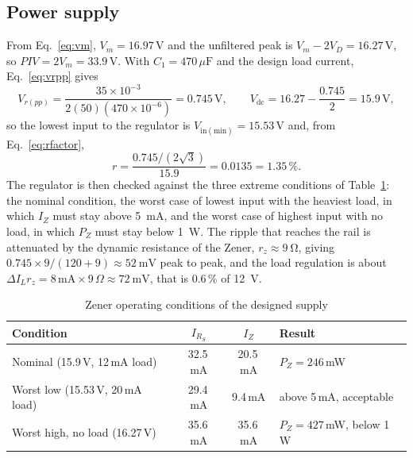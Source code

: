 \documentclass[12pt,a4paper]{article}
\begin{document}
	\subsection{Power supply}
	From Eq.~\eqref{eq:vm}, $V_m=16.97\,\mathrm{V}$ and the unfiltered peak is $V_m-2V_D=16.27\,\mathrm{V}$, so $PIV=2V_m=33.9\,\mathrm{V}$. With $C_1=470\,\mu\mathrm{F}$ and the design load current, Eq.~\eqref{eq:vrpp} gives
	\begin{equation}
		V_{r(pp)}=\frac{35\times10^{-3}}{2(50)(470\times10^{-6})}=0.745\,\mathrm{V},
		\qquad
		V_{\mathrm{dc}}=16.27-\frac{0.745}{2}=15.9\,\mathrm{V},
		\label{eq:calc-supply}
	\end{equation}
	so the lowest input to the regulator is $V_{\mathrm{in(min)}}=15.53\,\mathrm{V}$ and, from Eq.~\eqref{eq:rfactor},
	\begin{equation}
		r=\frac{0.745/(2\sqrt{3})}{15.9}=0.0135=1.35\,\%.
		\label{eq:calc-r}
	\end{equation}
	The regulator is then checked against the three extreme conditions of Table~\ref{tab:zener}: the nominal condition, the worst case of lowest input with the heaviest load, in which $I_Z$ must stay above \SI{5}{\milli\ampere}, and the worst case of highest input with no load, in which $P_Z$ must stay below \SI{1}{\watt}. The ripple that reaches the rail is attenuated by the dynamic resistance of the Zener, $r_z\approx\SI{9}{\ohm}$, giving $0.745\times9/(120+9)\approx\SI{52}{\milli\volt}$ peak to peak, and the load regulation is about $\Delta I_Lr_z=8\,\mathrm{mA}\times9\,\Omega\approx\SI{72}{\milli\volt}$, that is 0.6\,\% of \SI{12}{\volt}.

	\begin{table}[H]
		\centering
		\caption{Zener operating conditions of the designed supply}
		\label{tab:zener}
		\renewcommand{\arraystretch}{1.25}
		\begin{tabular}{|l|c|c|l|}
			\hline
			\rowcolor{black!12}\textbf{Condition} & \textbf{$I_{R_S}$} & \textbf{$I_Z$} & \textbf{Result} \\
			\hline
			Nominal (15.9\,V, 12\,mA load) & 32.5\,mA & 20.5\,mA & $P_Z=246$\,mW \\
			\hline
			Worst low (15.53\,V, 20\,mA load) & 29.4\,mA & 9.4\,mA & above 5\,mA, acceptable \\
			\hline
			Worst high, no load (16.27\,V) & 35.6\,mA & 35.6\,mA & $P_Z=427$\,mW, below 1\,W \\
			\hline
		\end{tabular}
	\end{table}
\end{document}
